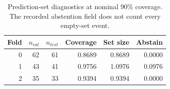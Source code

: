 \begin{table}[t]
\caption{Prediction-set diagnostics at nominal 90\% coverage. The recorded abstention field does not count every empty-set event.}
\label{tab:conformal}
\centering
\small
\setlength{\tabcolsep}{4pt}
\begin{tabular}{rrrrrr}
\toprule
Fold & $n_{cal}$ & $n_{test}$ & Coverage & Set size & Abstain \\
\midrule
0 & 62 & 61 & 0.8689 & 0.8689 & 0.0000 \\
1 & 43 & 41 & 0.9756 & 1.0976 & 0.0976 \\
2 & 35 & 33 & 0.9394 & 0.9394 & 0.0000 \\
\bottomrule
\end{tabular}
\end{table}
